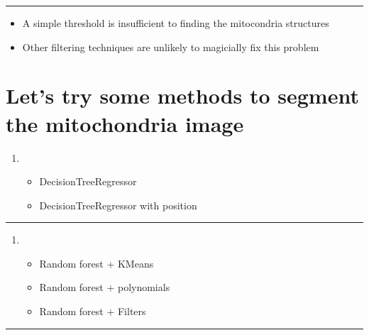 \documentclass[letterpaper,10pt,english]{sphinxmanual}
\begin{document}
\bigskip\hrule\bigskip

\begin{itemize}
\item {} 
\sphinxAtStartPar
A simple threshold is insufficient to finding the mitocondria structures

\item {} 
\sphinxAtStartPar
Other filtering techniques are unlikely to magicially fix this problem

\end{itemize}


\section{Let’s try some methods to segment the mitochondria image}
\label{\detokenize{05-SupervisedSegmentation:let-s-try-some-methods-to-segment-the-mitochondria-image}}\begin{enumerate}
%
\item {} 
\sphinxAtStartPar
{}
\begin{itemize}
\item {} 
\sphinxAtStartPar
DecisionTreeRegressor

\item {} 
\sphinxAtStartPar
DecisionTreeRegressor with position

\end{itemize}

\end{enumerate}


\bigskip\hrule\bigskip

\begin{enumerate}
%
\item {} 
\sphinxAtStartPar
{}
\begin{itemize}
\item {} 
\sphinxAtStartPar
Random forest + KMeans

\item {} 
\sphinxAtStartPar
Random forest + polynomials

\item {} 
\sphinxAtStartPar
Random forest + Filters

\end{itemize}

\end{enumerate}


\bigskip\hrule\bigskip
\end{document}
